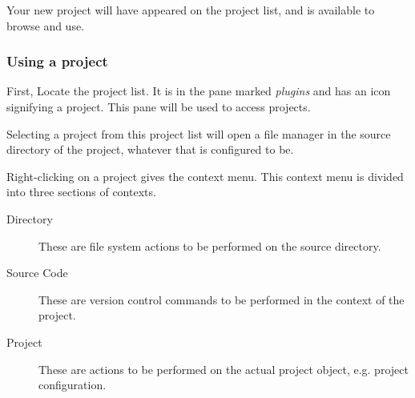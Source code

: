 \documentclass[10pt,a4paper,english]{article}
\newlength{\admonitionwidth}
\begin{document}
Your new project will have appeared on the project list, and is available to
browse and use.
\begin{center}\begin{sffamily}
\end{sffamily}
\end{center}



\hypertarget{using-a-project}{}
\subsubsection*{Using a project}

First, Locate the project list. It is in the pane marked \emph{plugins} and
has an icon signifying a project. This pane will be used to access projects.

Selecting a project from this project list will open a file manager in the
source directory of the project, whatever that is configured to be.

Right-clicking on a project gives the context menu. This context menu is
divided into three sections of contexts.
\begin{description}
\item[Directory ] %

These are file system actions to be performed on the source directory.

\item[Source Code] %

These are version control commands to be performed in the context of the
project.

\item[Project] %

These are actions to be performed on the actual project object, e.g.
project configuration.

\end{description}
\end{document}
